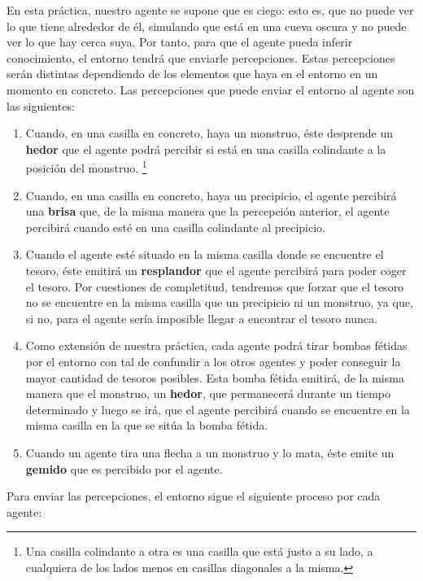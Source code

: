 En esta práctica, nuestro agente se supone que es ciego: esto es, que no puede ver lo que tiene alrededor de él, simulando que está en una cueva oscura y no puede ver lo que hay cerca suya. Por tanto, para que el agente pueda inferir conocimiento, el entorno tendrá que enviarle percepciones. Estas percepciones serán distintas dependiendo de los elementos que haya en el entorno en un momento en concreto. 
Las percepciones que puede enviar el entorno al agente son las siguientes:
\begin{enumerate}
    \item Cuando, en una casilla en concreto, haya un monstruo, éste desprende un \textbf{hedor} que el agente podrá percibir si está en una casilla colindante a la posición del monstruo. \footnote{Una casilla colindante a otra es una casilla que está justo a su lado, a cualquiera de los lados menos en casillas diagonales a la misma.}
    \item Cuando, en una casilla en concreto, haya un precipicio, el agente percibirá una \textbf{brisa} que, de la misma manera que la percepción anterior, el agente percibirá cuando esté en una casilla colindante al precipicio.
    \item Cuando el agente esté situado en la misma casilla donde se encuentre el tesoro, éste emitirá un \textbf{resplandor} que el agente percibirá para poder coger el tesoro. Por cuestiones de completitud, tendremos que forzar que el tesoro no se encuentre en la misma casilla que un precipicio ni un monstruo, ya que, si no, para el agente sería imposible llegar a encontrar el tesoro nunca.
    \item Como extensión de nuestra práctica, cada agente podrá tirar bombas fétidas por el entorno con tal de confundir a los otros agentes y poder conseguir la mayor cantidad de tesoros posibles. Esta bomba fétida emitirá, de la misma manera que el monstruo, un \textbf{hedor}, que permanecerá durante un tiempo determinado y luego se irá, que el agente percibirá cuando se encuentre en la misma casilla en la que se sitúa la bomba fétida.
    \item Cuando un agente tira una flecha a un monstruo y lo mata, éste emite un \textbf{gemido} que es percibido por el agente.
\end{enumerate}{}

Para enviar las percepciones, el entorno sigue el siguiente proceso por cada agente:

